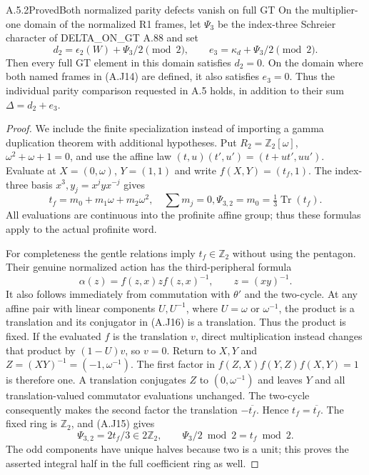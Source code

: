 \begin{result}{A.5.2}{Proved}{Both normalized parity defects vanish on full GT}
On the multiplier-one domain of the normalized R1 frames,
let $\Psi_3$ be the index-three Schreier character of
DELTA\_ON\_GT A.88 and set
\[
 d_2=\epsilon_2(W)+\Psi_3/2\pmod2,\qquad
 e_3=\kappa_d+\Psi_3/2\pmod2.
 \tag{A.J14}
\]
Then every full GT element in this domain satisfies $d_2=0$.
On the domain where both named frames in (A.J14) are defined,
it also satisfies $e_3=0$.  Thus the individual parity
comparison requested in A.5 holds, in addition to their sum
$\Delta=d_2+e_3$.
\end{result}
\begin{proof}
We include the finite specialization instead of importing a
gamma duplication theorem with additional hypotheses.  Put
$R_2=\mathbb Z_2[\omega]$, $\omega^2+\omega+1=0$, and use
the affine law $(t,u)(t',u')=(t+ut',uu')$.  Evaluate at
$X=(0,\omega)$, $Y=(1,1)$ and write
$f(X,Y)=(t_f,1)$.  The index-three basis
$x^3,y_j=x^jyx^{-j}$ gives
\[
 t_f=m_0+m_1\omega+m_2\omega^2,\quad \sum m_j=0,
 \Psi_{3,2}=m_0=\tfrac13\operatorname{Tr}(t_f).
 \tag{A.J15}
\]
All evaluations are continuous into the profinite affine
group; thus these formulas apply to the actual profinite word.

For completeness the gentle relations imply
$t_f\in\mathbb Z_2$ without using the pentagon.  Their genuine
normalized action has the third-peripheral formula
\[
 \alpha(z)=f(z,x)zf(z,x)^{-1},\qquad z=(xy)^{-1}.           \tag{A.J16}
\]
It also follows immediately from commutation with $\theta'$
and the two-cycle.  At any affine pair with linear components
$U,U^{-1}$, where $U=\omega$ or $\omega^{-1}$, the product
is a translation and its conjugator in (A.J16) is a
translation.  Thus the product is fixed.  If the evaluated
$f$ is the translation $v$, direct multiplication instead
changes that product by $(1-U)v$, so $v=0$.
Return to $X,Y$ and $Z=(XY)^{-1}=(-1,\omega^{-1})$.
The first factor in
$f(Z,X)f(Y,Z)f(X,Y)=1$ is therefore one.  A translation
conjugates $Z$ to $(0,\omega^{-1})$ and leaves $Y$ and all
translation-valued commutator evaluations unchanged.  The
two-cycle consequently makes the second factor the
translation $-\overline{t_f}$.  Hence $t_f=\overline{t_f}$.
The fixed ring is $\mathbb Z_2$, and (A.J15) gives
\[
 \Psi_{3,2}=2t_f/3\in2\mathbb Z_2,\qquad
          \Psi_3/2\bmod2=t_f\bmod2.                    \tag{A.J17}
\]
The odd components have unique halves because two is a unit;
this proves the asserted integral half in the full coefficient
ring as well.


\end{proof}
